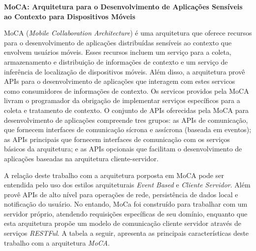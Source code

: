 \textbf{MoCA: Arquitetura para o Desenvolvimento de Aplicações Sensíveis ao Contexto para Dispositivos Móveis} \cite{moca_2004}\par
MoCA (\textit{Mobile Collaboration Architecture}) é uma arquitetura que oferece recursos para o desenvolvimento de aplicações distribuídas sensíveis ao contexto que envolvem usuários móveis. Esses recursos incluem um serviço para a coleta, armazenamento e distribuição de informações de contexto e um serviço de inferência de localização de dispositivos móveis. Além disso, a arquitetura provê APIs para o desenvolvimento de aplicações que interagem com estes servicos como consumidores de informações de contexto. Os servicos providos pela MoCA livram o programador da obrigação de implementar serviços específicos para a coleta e tratamento de contexto. O conjunto de APIs oferecidas pela MoCA para desenvolvimento de aplicações compreende tres grupos: as APIs de comunicação, que fornecem interfaces de comunicação sícrona e assícrona (baseada em eventos); as APIs principais que fornecem interfaces de comunicação com os serviços básicos da arquitetura; e as APIs opcionais que facilitam o desenvolvimento de aplicações baseadas na arquitetura cliente-servidor.\par

A relação deste trabalho com a arquitetura porposta em MoCA pode ser entendida pelo uso dos estilos arquiteturais \textit{Event Based} e \textit{Cliente Servidor}. Além provê APIs de alto nível para operações de rede, persistência de dados local e notificação do usuário. No entando, MoCa foi construído para trabalhar com um servidor próprio, atendendo requisições específicas de seu domínio, enquanto que esta arquitetura propõe um modelo de comunicação cliente servidor através de serviços \textit{RESTFul}. A tabela a seguir, apresenta as principais características deste trabalho com a arquitetura \textit{MoCA}.

